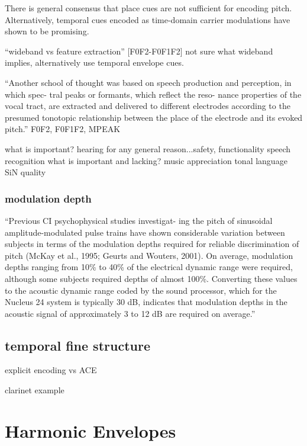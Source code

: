 \documentclass [11pt, proquest] {uwthesis}[2015/03/03]
\begin{document}
There is general consensus that place cues are not sufficient for encoding pitch.  Alternatively, temporal cues encoded as time-domain carrier modulations have shown to be promising.


``wideband vs feature extraction'' [F0F2-F0F1F2]
not sure what wideband implies, alternatively use temporal envelope cues.

``Another school of thought was based on speech production and perception, in which spec- tral peaks or formants, which reflect the reso- nance properties of the vocal tract, are extracted and delivered to different electrodes according to the presumed tonotopic relationship between the place of the electrode and its evoked pitch.'' %
F0F2, F0F1F2, MPEAK

    what is important?
        hearing for any general reason...safety, functionality
        speech recognition
    what is important and lacking?
        music appreciation
        tonal language
        SiN
        quality

\subsection{modulation depth}

``Previous CI psychophysical studies investigat- ing the pitch of sinusoidal amplitude-modulated pulse trains have shown considerable variation between subjects in terms of the modulation depths required for reliable discrimination of pitch (McKay et al., 1995; Geurts and Wouters, 2001). On average, modulation depths ranging from 10\% to 40\% of the electrical dynamic range were required, although some subjects required depths of almost 100\%. Converting these values to the acoustic dynamic range coded by the sound processor, which for the Nucleus 24 system is typically 30 dB, indicates that modulation depths in the acoustic signal of approximately 3 to 12 dB are required on average.'' %

\section{temporal fine structure}

explicit encoding vs ACE

clarinet example



\chapter{Harmonic Envelopes}
\end{document}
